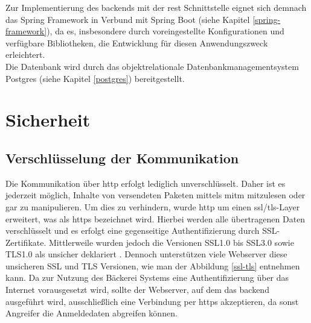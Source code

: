 Zur Implementierung des \gls{backend}s mit der \gls{rest} Schnittstelle eignet sich demnach das Spring Framework in Verbund mit Spring Boot (siehe Kapitel \ref{spring-framework}), da es, insbesondere durch voreingestellte Konfigurationen und verfügbare Bibliotheken, die Entwicklung für diesen Anwendungszweck erleichtert.
\\
Die Datenbank wird durch das objektrelationale Datenbankmanagementsystem Postgres (siehe Kapitel \ref{postgres}) bereitgestellt.

\clearpage

\section{Sicherheit}

\subsection{Verschlüsselung der Kommunikation}
Die Kommunikation über \gls{http} erfolgt lediglich unverschlüsselt.
Daher ist es jederzeit möglich, Inhalte von versendeten Paketen mittels \gls{mitm} mitzulesen oder gar zu manipulieren.
Um dies zu verhindern, wurde \gls{http} um einen \gls{ssl}/\gls{tls}-Layer erweitert, was als \gls{https} bezeichnet wird.
Hierbei werden alle übertragenen Daten verschlüsselt und es erfolgt eine gegenseitige Authentifizierung durch SSL-Zertifikate.
Mittlerweile wurden jedoch die Versionen SSL1.0 bis SSL3.0 sowie TLS1.0 als unsicher deklariert \cite{ssl}.
Dennoch unterstützen viele Webserver diese unsicheren SSL und TLS Versionen, wie man der Abbildung \ref{ssl-tls} entnehmen kann.
Da zur Nutzung des Bäckerei Systems eine Authentifizierung über das Internet vorausgesetzt wird, sollte der Webserver, auf dem das \gls{backend} ausgeführt wird, ausschließlich eine Verbindung per \gls{https} akzeptieren, da sonst Angreifer die Anmeldedaten abgreifen können.


\clearpage


